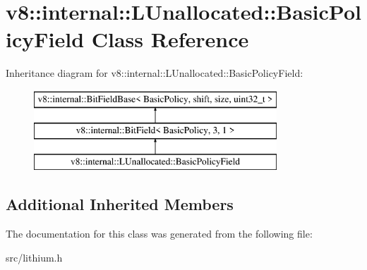 \hypertarget{classv8_1_1internal_1_1_l_unallocated_1_1_basic_policy_field}{}\section{v8\+:\+:internal\+:\+:L\+Unallocated\+:\+:Basic\+Policy\+Field Class Reference}
\label{classv8_1_1internal_1_1_l_unallocated_1_1_basic_policy_field}
Inheritance diagram for v8\+:\+:internal\+:\+:L\+Unallocated\+:\+:Basic\+Policy\+Field\+:\begin{figure}[H]
\begin{center}
\leavevmode
\includegraphics[height=3.000000cm]{classv8_1_1internal_1_1_l_unallocated_1_1_basic_policy_field}
\end{center}
\end{figure}
\subsection*{Additional Inherited Members}


The documentation for this class was generated from the following file\+:\begin{DoxyCompactItemize}
\item 
src/lithium.\+h\end{DoxyCompactItemize}
